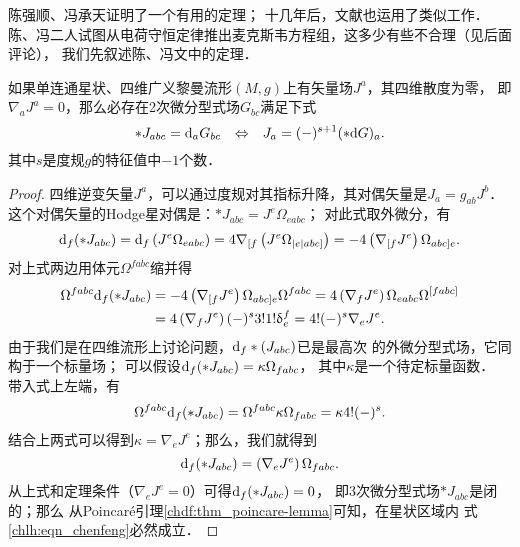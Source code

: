 陈强顺、冯承天\cite{chen-feng1989-cn,chen-yu1993-en}证明了一个有用的定理；
十几年后，文献\parencite{hehl-Obukhov-2003}也运用了类似工作．
陈、冯二人试图从电荷守恒定律推出麦克斯韦方程组，这多少有些不合理（见后面评论），
我们先叙述陈、冯文中的定理．
\begin{theorem}\label{chlh:thm_chenfeng}
    如果单连通星状、四维广义黎曼流形$(M,g)$上有矢量场$J^a$，其四维散度为零，
    即$\nabla_a J^a=0$，那么必存在2次微分型式场$G_{bc}$满足下式
    \begin{equation}\label{chlh:eqn_chenfeng}
        *J_{abc} = {\rm d}_a G_{bc}  {\quad  \Leftrightarrow \quad} J_a = (-)^{s+1} ( *{\rm d}G  )_a .
    \end{equation}
    其中$s$是度规$g$的特征值中$-1$个数．
\end{theorem}
\begin{proof}
    四维逆变矢量$J^a$，可以通过度规对其指标升降，其对偶矢量是${J_a} = {g_{ab}}{J^b}$．
    这个对偶矢量的Hodge星对偶是：$*J_{abc} = {J^e}\Omega _{eabc}$；
    对此式取外微分，有
    \begin{equation}
        {\rm d}_f(*{J_{abc}}) = {{\text{d}}_f}\left( {{J^e}{\Omega _{eabc}}} \right)
        = 4{\nabla _{[f}}\left( {{J^e}{\Omega _{|e|abc]}}} \right)
        = -4\left( {{\nabla _{[f}}{J^e}} \right){\Omega _{abc]e}} .
    \end{equation}
    对上式两边用体元${\Omega ^{fabc}}$缩并得
    \begin{align*}
        {\Omega ^{fabc}}{\rm d}_f (*{J_{abc}}) &=- 4\left( {{\nabla _{[f}}{J^e}} \right)
        {\Omega _{abc]e}}{\Omega ^{fabc}} = 4\left( {{\nabla _f}{J^e}} \right)
        {\Omega _{eabc}}{\Omega ^{[fabc]}} \\
        &= 4\left( {{\nabla _f}{J^e}} \right){(-)^s}
        3!1!\updelta _e^f = 4!{(- )^s}{\nabla _e}{J^e} .
    \end{align*}
    由于我们是在四维流形上讨论问题，${\rm d}_f*({J_{abc}})$已是最高次
    的外微分型式场，它同构于一个标量场；
    可以假设${\rm d}_f (*{J_{abc}}) = \kappa {\Omega _{fabc}}$，
    其中$\kappa$是一个待定标量函数． 带入式上左端，有
    \begin{equation}
        {\Omega ^{fabc}}{\rm d}_f (*{J_{abc}}) = {\Omega ^{fabc}}\kappa
        {\Omega _{fabc}} = \kappa 4!{(-)^s} .
    \end{equation}
    结合上两式可以得到$\kappa  = {\nabla _e}{J^e}$；那么，我们就得到
    \begin{equation}
        {\rm d}_f (*{J_{abc}}) = \left( {{\nabla _e}{J^e}} \right){\Omega _{fabc}} .
    \end{equation}
    从上式和定理条件（$\nabla_e J^e=0$）可得${\rm d}_f (*{J_{abc}}) = 0$，
    即3次微分型式场$*{J_{abc}}$是闭的；那么
    从Poincar\'e引理\ref{chdf:thm_poincare-lemma}可知，在星状区域内
    式\eqref{chlh:eqn_chenfeng}必然成立．
\end{proof}

